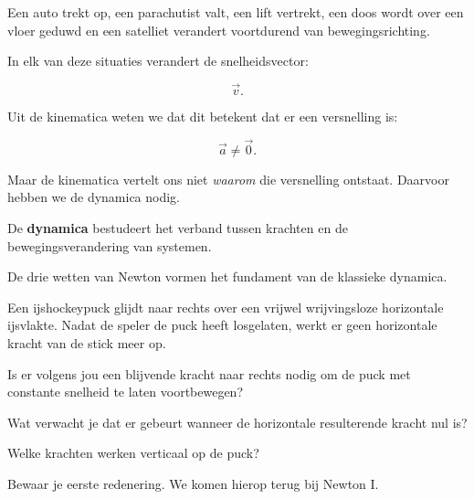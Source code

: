 \documentclass{ximera}
\begin{document}


Een auto trekt op, een parachutist valt, een lift vertrekt, een doos
wordt over een vloer geduwd en een satelliet verandert voortdurend van
bewegingsrichting.

In elk van deze situaties verandert de snelheidsvector:

\[
\vec v.
\]

Uit de kinematica weten we dat dit betekent dat er een versnelling is:

\[
\vec a\neq\vec 0.
\]

Maar de kinematica vertelt ons niet \emph{waarom} die versnelling
ontstaat. Daarvoor hebben we de dynamica nodig.

\begin{definitie}
De \textbf{dynamica} bestudeert het verband tussen krachten en de
bewegingsverandering van systemen.
\end{definitie}

De drie wetten van Newton vormen het fundament van de klassieke
dynamica.


\begin{oefening}{\oefB\ESS}

Een ijshockeypuck glijdt naar rechts over een vrijwel wrijvingsloze
horizontale ijsvlakte. Nadat de speler de puck heeft losgelaten, werkt
er geen horizontale kracht van de stick meer op.

\begin{question}
Is er volgens jou een blijvende kracht naar rechts nodig om de puck met
constante snelheid te laten voortbewegen?
\end{question}

\begin{question}
Wat verwacht je dat er gebeurt wanneer de horizontale resulterende
kracht nul is?
\end{question}

\begin{question}
Welke krachten werken verticaal op de puck?
\end{question}

Bewaar je eerste redenering. We komen hierop terug bij Newton I.

\end{oefening}


\end{document}
